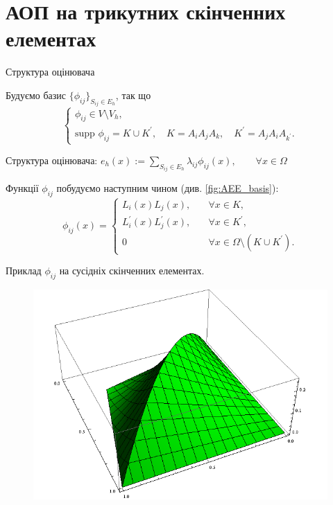 
\section{АОП на трикутних скінченних елементах}
\frame{\sectionpage}

\begin{frame}{Структура оцінювача}

	Будуємо базис $\lbrace \phi_{ij} \rbrace_{S_{ij} \in E_h}$, так що
%
	\begin{equation}\label{eq:basis_properties}
		\begin{cases}
			\phi_{ij} \in V \setminus V_h, \\
			\text{supp } \phi_{ij} = K \cup K^\prime, \quad K = A_iA_jA_k, \quad K^\prime = A_jA_iA_{k^\prime}.
		\end{cases}
	\end{equation}

	Структура оцінювача:
	$e_h(x) := \sum \limits_{S_{ij} \in E_h} \lambda_{ij} \phi_{ij}(x), \qquad \forall x \in \Omega$

	Функції $\phi_{ij}$ побудуємо наступним чином (див. \autoref{fig:AEE_basis}):
	\begin{equation}
		\phi_{ij}(x) =
		\begin{cases}
			L_i(x)L_j(x), &\quad \forall x \in K ,\\
			L_i^\prime(x)L_j^\prime(x), &\quad \forall x \in K^\prime ,\\
			0 &\quad \forall x \in \Omega \setminus (K \cup K^\prime).
		\end{cases}
	\end{equation}

\end{frame}

\begin{frame}{Приклад $\phi_{ij}$ на сусідніх скінченних елементах.}

		\begin{figure}[H]
			\centering
		    \includegraphics[height=0.75\textheight]{images/basis}
		    \label{fig:AEE_basis}
		\end{figure}

\end{frame}

